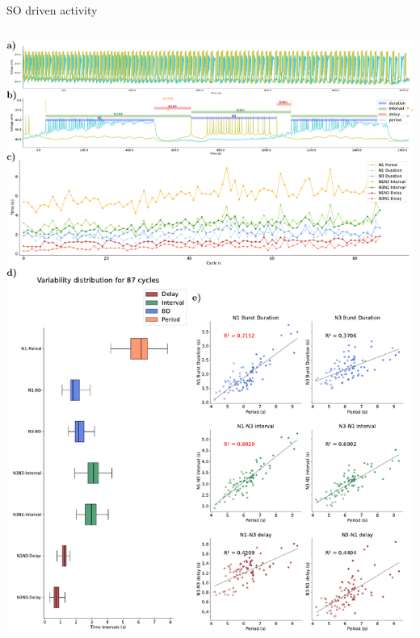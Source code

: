 \documentclass[aspectratio=43]{beamer}
\begin{document}
\begin{frame}{SO driven activity}
\begin{columns}
\begin{column}{0.5\textwidth}
			\includegraphics[width=\textwidth]{invariants/data/SUSSEX/prep4_so_driven_2/images/panel_with_intervals.pdf}
		\end{column}
	\end{columns}
\end{frame}
\end{document}
